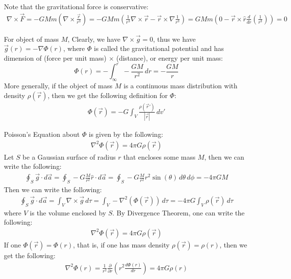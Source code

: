 \documentclass[11pt,oneside]{book}
\theoremstyle{break}
\theoremstyle{break}
\begin{document}
Note that the gravitational force is conservative:
\begin{align*}
\nabla \times \vec{F} = -GMm \left(\nabla \times \frac{\vec{r}}{r^3}\right) = -GMm \left( \frac{1}{r^3}\nabla \times \vec{r} - \vec{r} \times \nabla \frac{1}{r^3}\right) = GMm\left( 0-\vec{r}\times \hat{r}\frac{d}{dr}\left(\frac{1}{r^3}\right) \right) = 0
\end{align*}

For object of mass $M$, Clearly, we have $\nabla \times \vec{g} = 0$, thus we have $\vec{g}(r) = -\nabla \Phi(r)$, where $\Phi$ is called the gravitational potential and has dimension of (force per unit mass) $\times$ (distance), or energy per unit mass:
$$\Phi(r) = -\int_{\infty}^r -\frac{GM}{r^2} \, dr = -\frac{GM}{r}$$
More generally, if the object of mass $M$ is a continuous mass distribution with density $\rho(\vec{r}) $, then we get the following definition for $\Phi$:
\begin{align*}
\Phi (\vec{r}) = -G \int_V \frac{\rho(\vec{r}')}{|\vec{r}|}\, dv'
\end{align*}

Poisson's Equation about $\Phi$ is given by the following:
\begin{align*}
\nabla^2 \Phi(\vec{r}) = 4\pi G \rho(\vec{r})
\end{align*}
Let $S$ be a Gaussian surface of radius $r$ that encloses some mass $M$, then we can write the following:
\begin{align*}
\oint_S \vec{g}\cdot d\vec{a} = \oint_S - G\frac{M}{r^2}\hat{r}\cdot d\vec{a} = \oint_S -G\frac{M}{r^2}r^2 \sin(\theta) \, d\theta\, d\phi = -4\pi GM
\end{align*}
Then we can write the following:
\begin{align*}
 \oint_S \vec{g}\cdot d\vec{a} = \int_V \nabla \times \vec{g}\,d\tau = \int_V -\nabla^2 (\Phi(\vec{r})) \, d\tau = -4\pi G \int_V \rho(\vec{r}) \, d\tau
\end{align*}
where $V$ is the volume enclosed by $S$. By  Divergence Theorem, one can write the following:
\begin{align*}
\nabla^2 \Phi(\vec{r}) = 4\pi G\rho(\vec{r})
\end{align*}
If one $\Phi(\vec{r}) = \Phi(r)$, that is, if one has mass density $\rho(\vec{r}) = \rho(r)$, then we get the following:
\begin{align*}
\nabla^2 \Phi(r) = \frac{1}{r^2}\frac{\partial}{\partial r} \left( r^2 \frac{d\Phi(r)}{dr}\right) =  4\pi G \rho(r)
\end{align*}
\end{document}
